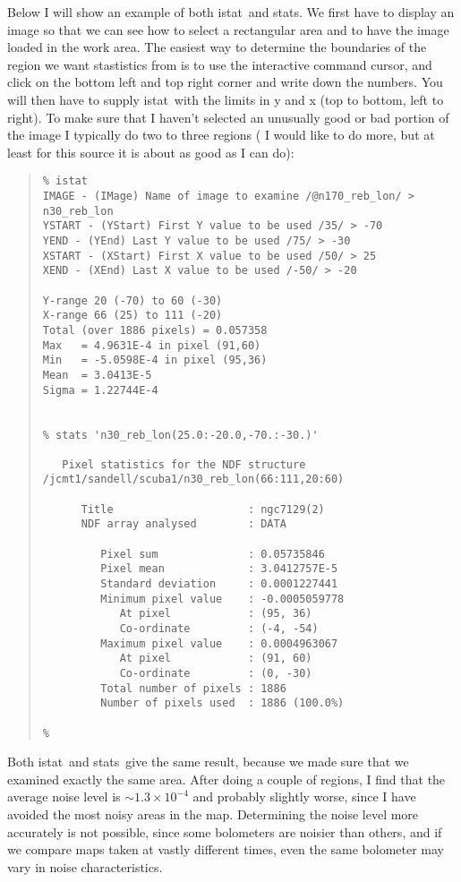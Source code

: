 \documentclass[twoside,11pt]{article}
\newenvironment{myquote}{\begin{quote}\begin{small}}{\end{small}\end{quote}}
\newcommand{\task}[1]{\textsf{#1}}
\newcommand{\stats}{\xref{\task{stats}}{sun95}{STATS}}
\newcommand{\cursor}{\xref{\task{cursor}}{sun95}{CURSOR}}
\newcommand{\istat}{\xref{\task{istat}}{sun86}{ISTAT}}
\newcommand{\xref}[3]{#1}
\begin{document}
Below I will show an example of both \istat\ and \stats. We first
have to display an image so that we can see how to select a rectangular
area and to have the image loaded in the work area. The easiest way to
determine the boundaries of the region we want stastistics from is to
use the interactive command \cursor, and click on the bottom left
and top right corner and write down the numbers. You will then have to
supply \istat\ with the limits in y and x (top to bottom, left to
right). To make sure that I haven't selected an unusually good or bad
portion of the image I typically do two to three regions ( I would like
to do more, but at least for this source it is about as good as I can do):

\begin{myquote} \begin{verbatim}
% istat
IMAGE - (IMage) Name of image to examine /@n170_reb_lon/ > n30_reb_lon
YSTART - (YStart) First Y value to be used /35/ > -70
YEND - (YEnd) Last Y value to be used /75/ > -30
XSTART - (XStart) First X value to be used /50/ > 25
XEND - (XEnd) Last X value to be used /-50/ > -20
 
Y-range 20 (-70) to 60 (-30)
X-range 66 (25) to 111 (-20)
Total (over 1886 pixels) = 0.057358
Max   = 4.9631E-4 in pixel (91,60)
Min   = -5.0598E-4 in pixel (95,36)
Mean  = 3.0413E-5
Sigma = 1.22744E-4
 

% stats 'n30_reb_lon(25.0:-20.0,-70.:-30.)'
 
   Pixel statistics for the NDF structure
/jcmt1/sandell/scuba1/n30_reb_lon(66:111,20:60)
 
      Title                     : ngc7129(2)
      NDF array analysed        : DATA
 
         Pixel sum              : 0.05735846
         Pixel mean             : 3.0412757E-5
         Standard deviation     : 0.0001227441
         Minimum pixel value    : -0.0005059778
            At pixel            : (95, 36)
            Co-ordinate         : (-4, -54)
         Maximum pixel value    : 0.0004963067
            At pixel            : (91, 60)
            Co-ordinate         : (0, -30)
         Total number of pixels : 1886
         Number of pixels used  : 1886 (100.0%)
 
% 
\end{verbatim} \end{myquote}

Both \istat\ and \stats\ give the same result, because we made sure that we
examined exactly the same area. After doing a couple of regions, I find that
the average noise level is $\sim 1.3\times 10^{-4}$ and probably slightly
worse, since I have avoided the most noisy areas in the map. Determining the
noise level more accurately is not possible, since some bolometers are noisier
than others, and if we compare maps taken at vastly different times, even the
same bolometer may vary in noise characteristics.
\end{document}
